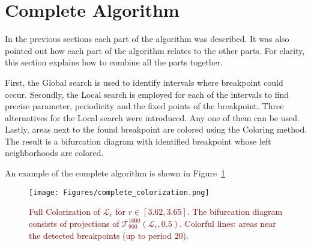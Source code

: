 \section{Complete Algorithm}
In the previous sections each part of the algorithm was described.
It was also pointed out how each part of the algorithm relates to the other parts.
For clarity, this section explains how to combine all the parts together.
\par
First, the Global search is used to identify intervals where breakpoint could occur.
Secondly, the Local search is employed for each of the intervals to find precise parameter, periodicity and the fixed points of the breakpoint.
Three alternatives for the Local search were introduced.
Any one of them can be used.
Lastly, areas next to the found breakpoint are colored using the Coloring method.
The result is a bifurcation diagram with identified breakpoint whose left neighborhoods are colored.
\par
An example of the complete algorithm is shown in Figure~\ref{fig:complete_colorization}

\begin{figure}[!h]
    \centering
    \texttt{[image: Figures/complete\_colorization.png]}
    \caption{
        \textcolor{darkred}{
        Full Colorization of $\mathcal{L}_{r}$ for $r \in [ 3.62, 3.65 ]$.
        The bifurcation diagram consists of projections of $\mathcal{T}_{900}^{1000}(\mathcal{L}_{r}, 0.5)$.
        Colorful lines: areas near the detected breakpoints (up to period $20$).
        }
    }
    \label{fig:complete_colorization}
\end{figure}

\endinput